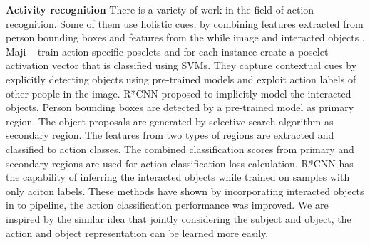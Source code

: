 
\textbf{Activity recognition}
There is a variety of work in the field of action recognition. Some of them use holistic cues, by combining features extracted from person bounding boxes and features from the while image and interacted objects \cite{}. Maji \etal~\cite{maji2011action} train action specific poselets and for each instance create a poselet activation vector that is classified using SVMs. They capture contextual cues by explicitly detecting objects using pre-trained models and exploit action labels of other people in the image. R*CNN \cite{gkioxari2015contextual} proposed to implicitly model the interacted objects. Person bounding boxes are detected by a pre-trained model as primary region. The object proposals are generated by selective search algorithm as secondary region. The features from two types of regions are extracted and classified to action classes. The combined classification scores from primary and secondary regions are used for action classification loss calculation. R*CNN has the capability of inferring the interacted objects while trained on samples with only aciton labels. These methods have shown by incorporating interacted objects in to pipeline, the action classification performance was improved. We are inspired by the similar idea that jointly considering the subject and object, the action and object representation can be learned more easily.
